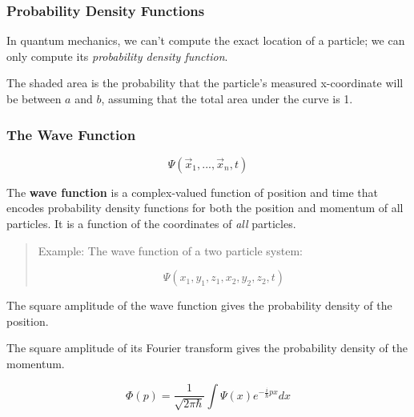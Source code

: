 \documentclass{beamer}
\begin{document}
\begin{frame}
\frametitle{Probability Density Functions}

\begin{center}
In quantum mechanics, we can't compute the exact location of a particle;
we can only compute its {\it probability density function}.

\vskip 12pt


The shaded area is the probability that the particle's measured x-coordinate will be between $a$ and $b$,
assuming that the total area under the curve is 1.
\end{center}

\end{frame}

\def\argt{(\vec{x}_1,...,\vec{x}_n,t)}
\def\arg{(\vec{x}_1,...,\vec{x}_n)}

\begin{frame}
\frametitle{The Wave Function}
\[ \Psi\argt \]

The {\bf wave function} is a complex-valued function of position and time that encodes
probability density functions for both the position and momentum of all particles.
It is a function of the coordinates of {\it all} particles.

\vskip 12pt
\begin{quotation}
Example: The wave function of a two particle system:

\[ \Psi(x_1,y_1,z_1,x_2,y_2,z_2,t) \]
\end{quotation}

The square amplitude of the wave function gives the probability density of the position.

The square amplitude of its Fourier transform gives the probability density of the momentum.

\[ \Phi(p) = \frac{1}{\sqrt{2\pi\hbar}}\int \Psi(x)e^{-\frac{i}{\hbar}px}dx \]
\end{frame}
\end{document}
